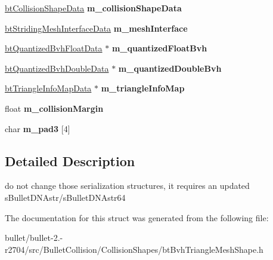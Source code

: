 \begin{DoxyCompactItemize}
\item 
\hypertarget{structbt_triangle_mesh_shape_data_a506e71267b5147cfbb1d2e0608d2df03}{\hyperlink{structbt_collision_shape_data}{bt\+Collision\+Shape\+Data} {\bfseries m\+\_\+collision\+Shape\+Data}}\label{structbt_triangle_mesh_shape_data_a506e71267b5147cfbb1d2e0608d2df03}

\item 
\hypertarget{structbt_triangle_mesh_shape_data_a09fa7f39afd4977baebde7c100b64e62}{\hyperlink{structbt_striding_mesh_interface_data}{bt\+Striding\+Mesh\+Interface\+Data} {\bfseries m\+\_\+mesh\+Interface}}\label{structbt_triangle_mesh_shape_data_a09fa7f39afd4977baebde7c100b64e62}

\item 
\hypertarget{structbt_triangle_mesh_shape_data_a425c88562f77aa7489043a2677c59fb9}{\hyperlink{structbt_quantized_bvh_float_data}{bt\+Quantized\+Bvh\+Float\+Data} $\ast$ {\bfseries m\+\_\+quantized\+Float\+Bvh}}\label{structbt_triangle_mesh_shape_data_a425c88562f77aa7489043a2677c59fb9}

\item 
\hypertarget{structbt_triangle_mesh_shape_data_a30df8f3147c30cf5e49c4d64fec5aa82}{\hyperlink{structbt_quantized_bvh_double_data}{bt\+Quantized\+Bvh\+Double\+Data} $\ast$ {\bfseries m\+\_\+quantized\+Double\+Bvh}}\label{structbt_triangle_mesh_shape_data_a30df8f3147c30cf5e49c4d64fec5aa82}

\item 
\hypertarget{structbt_triangle_mesh_shape_data_a95ef1687d4088f7ebe04f0fde7f0084e}{\hyperlink{structbt_triangle_info_map_data}{bt\+Triangle\+Info\+Map\+Data} $\ast$ {\bfseries m\+\_\+triangle\+Info\+Map}}\label{structbt_triangle_mesh_shape_data_a95ef1687d4088f7ebe04f0fde7f0084e}

\item 
\hypertarget{structbt_triangle_mesh_shape_data_a7e26d428e0a04f8ea794189d7d378d70}{float {\bfseries m\+\_\+collision\+Margin}}\label{structbt_triangle_mesh_shape_data_a7e26d428e0a04f8ea794189d7d378d70}

\item 
\hypertarget{structbt_triangle_mesh_shape_data_a414518d41a7d7f8fb7271dd42dc41460}{char {\bfseries m\+\_\+pad3} \mbox{[}4\mbox{]}}\label{structbt_triangle_mesh_shape_data_a414518d41a7d7f8fb7271dd42dc41460}

\end{DoxyCompactItemize}


\subsection{Detailed Description}
do not change those serialization structures, it requires an updated s\+Bullet\+D\+N\+Astr/s\+Bullet\+D\+N\+Astr64 

The documentation for this struct was generated from the following file\+:\begin{DoxyCompactItemize}
\item 
bullet/bullet-\/2.-\/r2704/src/\+Bullet\+Collision/\+Collision\+Shapes/bt\+Bvh\+Triangle\+Mesh\+Shape.\+h\end{DoxyCompactItemize}
